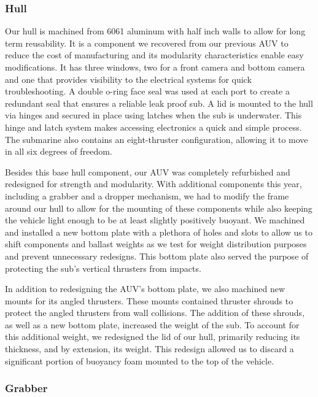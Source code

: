 \documentclass[conference]{IEEEtran}
\begin{document}
\subsubsection{Hull}
\label{sssec:hull}
Our hull is machined from 6061 aluminum with half inch walls to allow for long term reusability. It is a component we recovered from our previous AUV to reduce the cost of manufacturing and its modularity characteristics enable easy modifications. It has three windows, two for a front camera and bottom camera and one that provides visibility to the electrical systems for quick troubleshooting. A double o-ring face seal was used at each port to create a redundant seal that ensures a reliable leak proof sub. A lid is mounted to the hull via hinges and secured in place using latches when the sub is underwater. This hinge and latch system makes accessing electronics a quick and simple process. The submarine also contains an eight-thruster configuration, allowing it to move in all six degrees of freedom.

Besides this base hull component, our AUV was completely refurbished and redesigned for strength and modularity. With additional components this year, including a grabber and a dropper mechanism, we had to modify the frame around our hull to allow for the mounting of these components while also keeping the vehicle light enough to be at least slightly positively buoyant. We machined and installed a new bottom plate with a plethora of holes and slots to allow us to shift components and ballast weights as we test for weight distribution purposes and prevent unnecessary redesigns. This bottom plate also served the purpose of protecting the sub’s vertical thrusters from impacts. 

In addition to redesigning the AUV’s bottom plate, we also machined new mounts for its angled thrusters. These mounts contained thruster shrouds to protect the angled thrusters from wall collisions. The addition of these shrouds, as well as a new bottom plate, increased the weight of the sub. To account for this additional weight, we redesigned the lid of our hull, primarily reducing its thickness, and by extension, its weight. This redesign allowed us to discard a significant portion of buoyancy foam mounted to the top of the vehicle. 

\subsubsection{Grabber}
\label{sssec:grabber}
\end{document}

